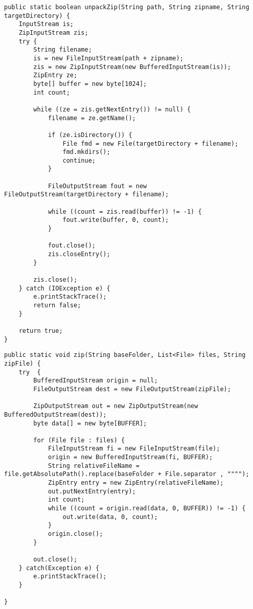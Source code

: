 \begin{lstlisting}[caption={Query code}, label={lst:mot-query}]
public static boolean unpackZip(String path, String zipname, String targetDirectory) {
	InputStream is;
	ZipInputStream zis;
	try {
		String filename;
		is = new FileInputStream(path + zipname);
		zis = new ZipInputStream(new BufferedInputStream(is));
		ZipEntry ze;
		byte[] buffer = new byte[1024];
		int count;

		while ((ze = zis.getNextEntry()) != null) {
			filename = ze.getName();

			if (ze.isDirectory()) {
				File fmd = new File(targetDirectory + filename);
				fmd.mkdirs();
				continue;
			}

			FileOutputStream fout = new FileOutputStream(targetDirectory + filename);

			while ((count = zis.read(buffer)) != -1) {
				fout.write(buffer, 0, count);
			}

			fout.close();
			zis.closeEntry();
		}

		zis.close();
	} catch (IOException e) {
		e.printStackTrace();
		return false;
	}

	return true;
}
\end{lstlisting}



\begin{lstlisting}[caption={Recommended related code}, label={lst:mot-related}]
public static void zip(String baseFolder, List<File> files, String zipFile) {
	try  {
		BufferedInputStream origin = null;
		FileOutputStream dest = new FileOutputStream(zipFile);

		ZipOutputStream out = new ZipOutputStream(new BufferedOutputStream(dest));
		byte data[] = new byte[BUFFER];

		for (File file : files) {
			FileInputStream fi = new FileInputStream(file);
			origin = new BufferedInputStream(fi, BUFFER);
			String relativeFileName = file.getAbsolutePath().replace(baseFolder + File.separator , """");
			ZipEntry entry = new ZipEntry(relativeFileName);
			out.putNextEntry(entry);
			int count;
			while ((count = origin.read(data, 0, BUFFER)) != -1) {
				out.write(data, 0, count);
			}
			origin.close();
		}

		out.close();
	} catch(Exception e) {
		e.printStackTrace();
	}

}
\end{lstlisting}
